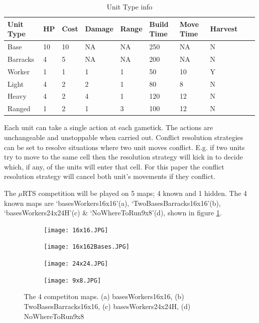 \documentclass[]{article}
\begin{document}
\begin{table}[]
\caption{Unit Type info}
\begin{tabular}{llllllllll}
\hline
Unit Type& HP &Cost & Damage & Range & Build Time  & Move Time  & Harvest  \\ \midrule
Base & 10  & 10 & NA & NA & 250 & NA & N   \\ 
Barracks & 4  & 5   & NA & NA & 200 & NA& N  \\
Worker & 1  & 1  & 1 & 1 & 50 & 10 & Y \\
Light & 4  & 2  & 2 & 1 & 80 & 8 & N \\
Heavy & 4  & 2  & 4 & 1 & 120 & 12 & N\\
Ranged  & 1  & 2  & 1 & 3 & 100 & 12 &N \\ \bottomrule
\end{tabular}
\label{table:UnitTypeinfo}
\end{table}

Each unit can take a single action at each gametick. The actions are unchangeable and unstoppable when carried out. Conflict resolution strategies can be set to resolve situations where two unit moves conflict. E.g. if two units try to move to the same cell then the resolution strategy will kick in to decide which, if any, of the units will enter that cell. For this paper the conflict resolution strategy will cancel both unit’s movements if they conflict.


The $\mu$RTS competition will be played on 5 maps; 4 known and 1 hidden. The 4 known maps are `basesWorkers16x16'(a), `TwoBasesBarracks16x16'(b), `basesWorkers24x24H'(c) \& `NoWhereToRun9x8'(d), shown in figure \ref{fig:maps}.

\begin{figure}
    \centering
    \begin{subfigure}{.25\textwidth}
        \centering
        \texttt{[image: 16x16.JPG]}
        \caption{}
    \end{subfigure}%
    \begin{subfigure}{0.25\textwidth}
        \centering
        \texttt{[image: 16x162Bases.JPG]}
        \caption{}
    \end{subfigure}%
    \begin{subfigure}{.25\textwidth}
        \centering
        \texttt{[image: 24x24.JPG]}
        \caption{}
    \end{subfigure}%
    \begin{subfigure}{.25\textwidth}
        \centering
        \texttt{[image: 9x8.JPG]}
        \caption{}
    \end{subfigure}%
    \caption{The 4 competiton maps. (a) basesWorkers16x16, (b) TwoBasesBarracks16x16, (c) basesWorkers24x24H, (d) NoWhereToRun9x8}
    \label{fig:maps}
\end{figure}
\end{document}

